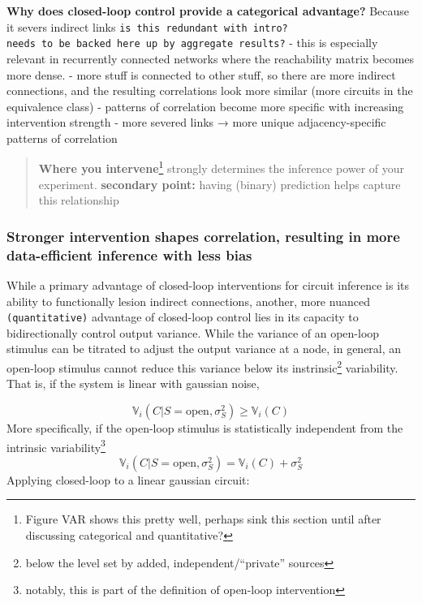 \textbf{Why does closed-loop control provide a categorical advantage?}
Because it severs indirect links
\texttt{is\ this\ redundant\ with\ intro?}
\texttt{needs\ to\ be\ backed\ here\ up\ by\ aggregate\ results?} - this
is especially relevant in recurrently connected networks where the
reachability matrix becomes more dense. - more stuff is connected to
other stuff, so there are more indirect connections, and the resulting
correlations look more similar (more circuits in the equivalence class)
- patterns of correlation become more specific with increasing
intervention strength - more severed links → more unique
adjacency-specific patterns of correlation

\begin{quote}
\textbf{Where you intervene}\footnote{Figure VAR shows this pretty well,
  perhaps sink this section until after discussing categorical and
  quantitative?} strongly determines the inference power of your
experiment. \textbf{secondary point:} having (binary) prediction helps
capture this relationship
\end{quote}

\hypertarget{stronger-intervention-shapes-correlation-resulting-in-more-data-efficient-inference-with-less-bias}{%
\subsubsection{Stronger intervention shapes correlation, resulting in
more data-efficient inference with less
bias}\label{stronger-intervention-shapes-correlation-resulting-in-more-data-efficient-inference-with-less-bias}}

While a primary advantage of closed-loop interventions for circuit
inference is its ability to functionally lesion indirect connections,
another, more nuanced \texttt{(quantitative)} advantage of closed-loop
control lies in its capacity to bidirectionally control output variance.
While the variance of an open-loop stimulus can be titrated to adjust
the output variance at a node, in general, an open-loop stimulus cannot
reduce this variance below its instrinsic\footnote{below the level set
  by added, independent/``private'' sources} variability. That is, if
the system is linear with gaussian noise,

\[\mathbb{V}_{i}(C|S=\text{open},\sigma^2_S) \geq \mathbb{V}_{i}(C)\]
More specifically, if the open-loop stimulus is statistically
independent from the intrinsic variability\footnote{notably, this is
  part of the definition of open-loop intervention}
\[\mathbb{V}_{i}(C|S=\text{open},\sigma^2_S) = \mathbb{V}_{i}(C) + \sigma^2_S\]
Applying closed-loop to a linear gaussian circuit:

